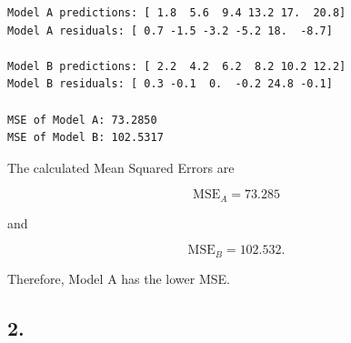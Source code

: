 \documentclass[11pt]{article}
\begin{document}
    \begin{Verbatim}[commandchars=\\\{\}]
Model A predictions: [ 1.8  5.6  9.4 13.2 17.  20.8]
Model A residuals: [ 0.7 -1.5 -3.2 -5.2 18.  -8.7]

Model B predictions: [ 2.2  4.2  6.2  8.2 10.2 12.2]
Model B residuals: [ 0.3 -0.1  0.  -0.2 24.8 -0.1]

MSE of Model A: 73.2850
MSE of Model B: 102.5317
    \end{Verbatim}

    The calculated Mean Squared Errors are

\[
{\mathrm{MSE}_A = 73.285}
\]

and

\[
{\mathrm{MSE}_B = 102.532}.
\]

Therefore, Model A has the lower MSE.

    \subsection{2.}
\end{document}
